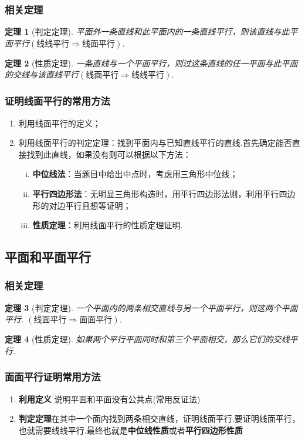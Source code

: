 \documentclass{BHCexam}
\newtheorem{Therome}{定理}[section]
\begin{document}
\subsubsection{相关定理}
\begin{Therome}[判定定理]
平面外一条直线和此平面内的一条直线平行，则该直线与此平面平行$(\text{线线平行}\Rightarrow\text{线面平行})$.
\end{Therome}
\begin{Therome}[性质定理]
一条直线与一个平面平行，则过这条直线的任一平面与此平面的交线与该直线平行$(\text{线面平行}\Rightarrow\text{线线平行})$.
\end{Therome}
\subsubsection{证明线面平行的常用方法}
\begin{enumerate}[(1)]
\item 利用线面平行的定义；
\item 利用线面平行的判定定理：找到平面内与已知直线平行的直线.首先确定能否直接找到此直线，如果没有则可以根据以下方法：
\begin{enumerate}[i)]
\item \textbf{中位线法}：当题目中给出中点时，考虑用三角形中位线；
\item \textbf{平行四边形法}：无明显三角形构造时，用平行四边形法则，利用平行四边形的对边平行且想等证明；
\item \textbf{性质定理}：利用线面平行的性质定理证明.
\end{enumerate}
\end{enumerate}

\subsection{平面和平面平行}
\subsubsection{相关定理}
\begin{Therome}[判定定理]
一个平面内的两条相交直线与另一个平面平行，则这两个平面平行.
$(\text{线面平行}\Rightarrow\text{面面平行})$.
\end{Therome}
\begin{Therome}[性质定理]
如果两个平行平面同时和第三个平面相交，那么它们的交线平行.
\end{Therome}
\subsubsection{面面平行证明常用方法}
\begin{enumerate}[1)]
\item \textbf{利用定义}\quad  
说明平面和平面没有公共点(常用反证法)
\item \textbf{判定定理}\quad 在其中一个面内找到两条相交直线，证明线面平行.要证明线面平行，也就需要线线平行.最终也就是\textbf{中位线性质}或者\textbf{平行四边形性质} 
\end{enumerate}
\end{document}

